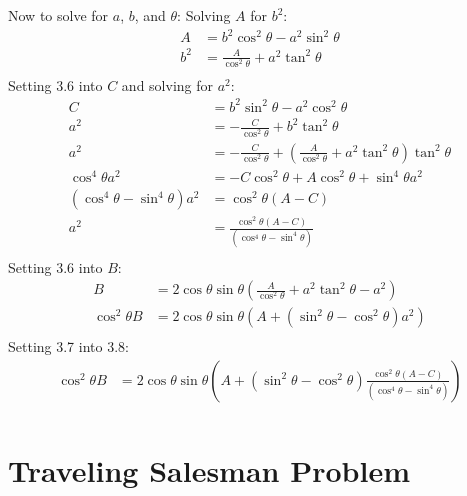 Now to solve for $a$, $b$, and $\theta$:
Solving $A$ for $b^2$:
\begin{equation}
	\begin{split}
		A &= b^2 \cos^2\theta - a^2 \sin^2\theta \\
		b^2 &= \frac{A}{\cos^2\theta} + a^2\tan^2\theta \\
	\end{split}
\end{equation}
Setting 3.6 into $C$ and solving for $a^2$:
\begin{equation}
	\begin{split}
		C &= b^2 \sin^2\theta - a^2 \cos^2\theta \\
		a^2 &= -\frac{C}{\cos^2\theta} + b^2\tan^2\theta \\
		a^2 &= -\frac{C}{\cos^2\theta} + \left(\frac{A}{\cos^2\theta} + a^2\tan^2\theta\right)\tan^2\theta \\
		\cos^4\theta a^2 &= -C\cos^2\theta + A\cos^2\theta + \sin^4\theta a^2 \\
		(\cos^4\theta - \sin^4\theta) a^2  &= \cos^2\theta(A-C) \\
		a^2  &= \frac{\cos^2\theta(A-C)}{(\cos^4\theta - \sin^4\theta)} \\
	\end{split}
\end{equation}
Setting 3.6 into $B$:
\begin{equation}
	\begin{split}
		B &= 2 \cos\theta\sin\theta(\frac{A}{\cos^2\theta} + a^2\tan^2\theta - a^2) \\
		\cos^2\theta B &= 2 \cos\theta\sin\theta(A + (\sin^2\theta - \cos^2\theta) a^2) \\
	\end{split}
\end{equation}
Setting 3.7 into 3.8:
\begin{equation}
	\begin{split}
		\cos^2\theta B &= 2 \cos\theta\sin\theta(A + (\sin^2\theta - \cos^2\theta) \frac{\cos^2\theta(A-C)}{(\cos^4\theta - \sin^4\theta)}) \\
	\end{split}
\end{equation}

\section{Traveling Salesman Problem}


